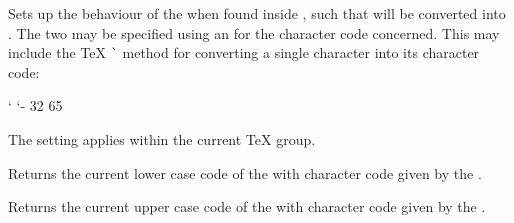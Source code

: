 \documentclass[oneside]{book}
\begin{document}
\begin{function}{\CharSetUccode}
\begin{syntax}
  
\end{syntax}
Sets up the behaviour of the  when
found inside , such that 
will be converted into . The two 
may be specified using an  for the character code
concerned. This may include the \TeX{} \verb|`|
method for converting a single character into its character code:
\begin{codehigh}
 {`\A} %
 {`\a - 32}
 {65}
\end{codehigh}
The setting applies within the current \TeX{} group.
\end{function}

\begin{function}{\CharValueLccode}
\begin{syntax}
 
\end{syntax}
Returns the current lower case code of the  with
character code given by the
.
\end{function}

\begin{function}{\CharValueUccode}
\begin{syntax}
 
\end{syntax}
Returns the current upper case code of the  with
character code given by the
.
\end{function}

%
\end{document}
